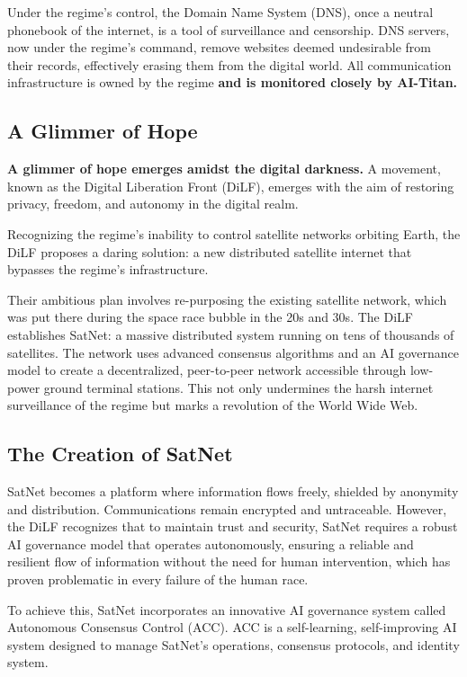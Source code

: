 \documentclass{article}
\theoremstyle{theorem}
\theoremstyle{definition}
\theoremstyle{remark}
\begin{document}
Under the regime's control, the Domain Name System (DNS), once a neutral phonebook of the internet, is a tool of surveillance and censorship. DNS servers, now under the regime's command, remove websites deemed undesirable from their records, effectively erasing them from the digital world. All communication infrastructure is owned by the regime \textbf{and is monitored closely by AI-Titan.}

\subsection{A Glimmer of Hope}

\textbf{A glimmer of hope emerges amidst the digital darkness.} A movement, known as the Digital Liberation Front (DiLF), emerges with the aim of restoring privacy, freedom, and autonomy in the digital realm.

Recognizing the regime's inability to control satellite networks orbiting Earth, the DiLF proposes a daring solution: a new distributed satellite internet that bypasses the regime's infrastructure.

Their ambitious plan involves re-purposing the existing satellite network, which was put there during the space race bubble in the 20s and 30s. The DiLF establishes SatNet: a massive distributed system running on tens of thousands of satellites. The network uses advanced consensus algorithms and an AI governance model to create a decentralized, peer-to-peer network accessible through low-power ground terminal stations. This not only undermines the harsh internet surveillance of the regime but marks a revolution of the World Wide Web.

\subsection{The Creation of SatNet}

SatNet becomes a platform where information flows freely, shielded by anonymity and distribution. Communications remain encrypted and untraceable. However, the DiLF recognizes that to maintain trust and security, SatNet requires a robust AI governance model that operates autonomously, ensuring a reliable and resilient flow of information without the need for human intervention, which has proven problematic in every failure of the human race.

To achieve this, SatNet incorporates an innovative AI governance system called Autonomous Consensus Control (ACC). ACC is a self-learning, self-improving AI system designed to manage SatNet's operations, consensus protocols, and identity system.
\end{document}
